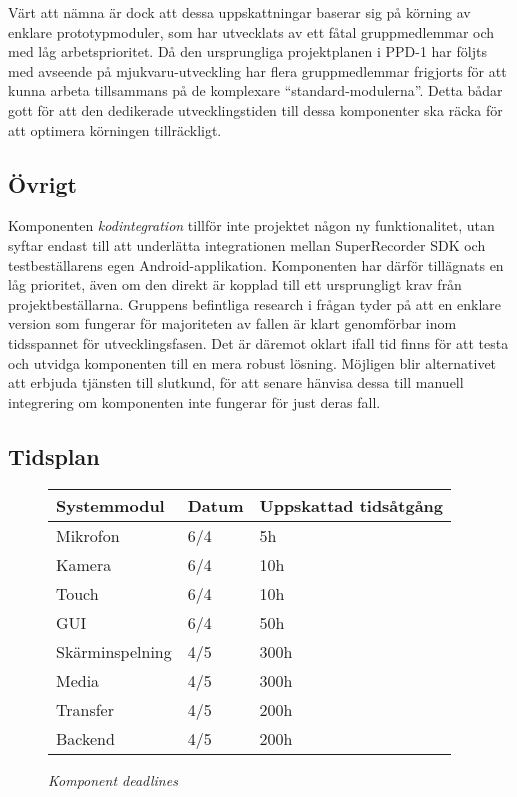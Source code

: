 Värt att nämna är dock att dessa uppskattningar baserar sig på körning av enklare prototypmoduler, som har utvecklats av ett fåtal gruppmedlemmar och med låg arbetsprioritet. Då den ursprungliga projektplanen i PPD-1 har följts med avseende på mjukvaru-utveckling har flera gruppmedlemmar frigjorts för att kunna arbeta tillsammans på de komplexare ``standard-modulerna''. Detta bådar gott för att den dedikerade utvecklingstiden till dessa komponenter ska räcka för att optimera körningen tillräckligt.

\subsection{Övrigt} %
\label{sub:Ovrigt}

Komponenten \textit{kodintegration} tillför inte projektet någon ny funktionalitet, utan syftar endast till att underlätta integrationen mellan SuperRecorder SDK och testbeställarens egen Android-applikation. Komponenten har därför tillägnats en låg prioritet, även om den direkt är kopplad till ett ursprungligt krav från projektbeställarna. Gruppens befintliga research i frågan tyder på att en enklare version som fungerar för majoriteten av fallen är klart genomförbar inom tidsspannet för utvecklingsfasen. Det är däremot oklart ifall tid finns för att testa och utvidga komponenten till en mera robust lösning. Möjligen blir alternativet att erbjuda tjänsten till slutkund, för att senare hänvisa dessa till manuell integrering om komponenten inte fungerar för just deras fall.


\subsection{Tidsplan}
\begin{figure}[H]
\centering
\begin{tabular}{ | l | l | l |}
  \hline
  \textbf{Systemmodul} & \textbf{Datum} & \textbf{Uppskattad tidsåtgång} \\ \hline
  Mikrofon & 6/4 & 5h \\ \hline
  Kamera & 6/4 & 10h  \\ \hline
  Touch & 6/4 & 10h \\ \hline
  GUI & 6/4 & 50h \\ \hline
  Skärminspelning & 4/5 & 300h \\ \hline
  Media & 4/5 & 300h \\ \hline
  Transfer & 4/5 & 200h \\ \hline
  Backend & 4/5 & 200h \\ \hline
\end{tabular}
\caption*{\textit{Komponent deadlines}}
\end{figure}
